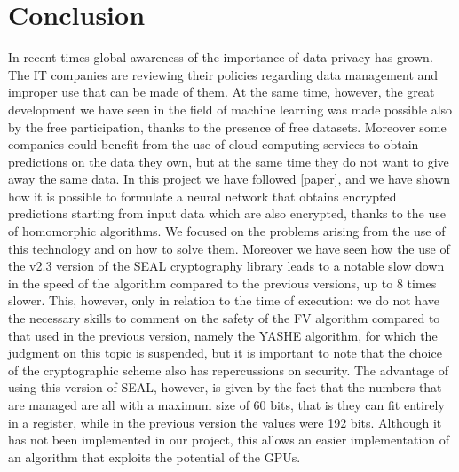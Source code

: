 \section{Conclusion}

In recent times global awareness of the importance of data privacy has grown. The IT companies are reviewing their policies regarding data management and improper use that can be made of them. At the same time, however, the great development we have seen in the field of machine learning was made possible also by the free participation, thanks to the presence of free datasets. Moreover some companies could benefit from the use of cloud computing services to obtain predictions on the data they own, but at the same time they do not want to give away the same data. In this project we have followed [paper], and we have shown how it is possible to formulate a neural network that obtains encrypted predictions starting from input data which are also encrypted, thanks to the use of homomorphic algorithms. We focused on the problems arising from the use of this technology and on how to solve them. Moreover we have seen how the use of the v2.3 version of the SEAL cryptography library leads to a notable slow down in the speed of the algorithm compared to the previous versions, up to 8 times slower. This, however, only in relation to the time of execution: we do not have the necessary skills to comment on the safety of the FV algorithm compared to that used in the previous version, namely the YASHE algorithm, for which the judgment on this topic is suspended, but it is important to note that the choice of the cryptographic scheme also has repercussions on security. The advantage of using this version of SEAL, however, is given by the fact that the numbers that are managed are all with a maximum size of 60 bits, that is they can fit entirely in a register, while in the previous version the values were 192 bits. Although it has not been implemented in our project, this allows an easier implementation of an algorithm that exploits the potential of the GPUs.